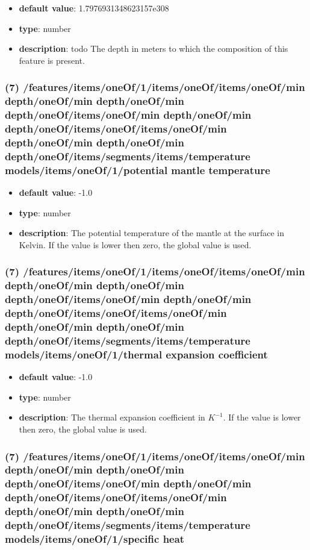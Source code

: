 \begin{itemize}[leftmargin=7em]\item {\bf default value}: 1.7976931348623157e308
\item {\bf type}: number
\item {\bf description}: todo The depth in meters to which the composition of this feature is present.
\end{itemize}\subsubsection{(7) /features/items/oneOf/1/items/oneOf/items/oneOf/min depth/oneOf/min depth/oneOf/min depth/oneOf/items/oneOf/min depth/oneOf/min depth/oneOf/items/oneOf/items/oneOf/min depth/oneOf/min depth/oneOf/min depth/oneOf/items/segments/items/temperature models/items/oneOf/1/potential mantle temperature}
\begin{itemize}[leftmargin=7em]\item {\bf default value}: -1.0
\item {\bf type}: number
\item {\bf description}: The potential temperature of the mantle at the surface in Kelvin. If the value is lower then zero, the global value is used.
\end{itemize}\subsubsection{(7) /features/items/oneOf/1/items/oneOf/items/oneOf/min depth/oneOf/min depth/oneOf/min depth/oneOf/items/oneOf/min depth/oneOf/min depth/oneOf/items/oneOf/items/oneOf/min depth/oneOf/min depth/oneOf/min depth/oneOf/items/segments/items/temperature models/items/oneOf/1/thermal expansion coefficient}
\begin{itemize}[leftmargin=7em]\item {\bf default value}: -1.0
\item {\bf type}: number
\item {\bf description}: The thermal expansion coefficient in $K^{-1}$. If the value is lower then zero, the global value is used.
\end{itemize}\subsubsection{(7) /features/items/oneOf/1/items/oneOf/items/oneOf/min depth/oneOf/min depth/oneOf/min depth/oneOf/items/oneOf/min depth/oneOf/min depth/oneOf/items/oneOf/items/oneOf/min depth/oneOf/min depth/oneOf/min depth/oneOf/items/segments/items/temperature models/items/oneOf/1/specific heat}
